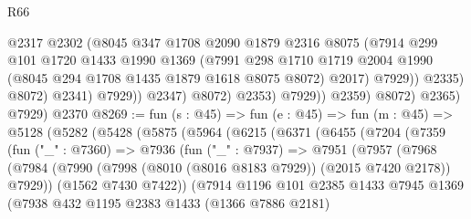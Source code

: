 \begin{lexlean}{R66}
\begin{coremodule}
                                @2317
                                @2302
                                (@8045
                                  @347
                                  @1708
                                  @2090
                                  @1879
                                  @2316
                                  @8075
                                  (@7914
                                    @299
                                    @101
                                    @1720
                                    @1433
                                    @1990
                                    @1369
                                    (@7991
                                      @298
                                      @1710
                                      @1719
                                      @2004
                                      @1990
                                      (@8045 @294 @1708 @1435 @1879 @1618 @8075 @8072)
                                      @2017)
                                    @7929))
                                @2335)
                              @8072)
                            @2341)
                          @7929))
                      @2347)
                    @8072)
                  @2353)
                @7929))
            @2359)
          @8072)
        @2365)
      @7929)
    @2370
@8269 := fun (s : @45) =>
  fun (e : @45) =>
  fun (m : @45) =>
  @5128
    (@5282
      (@5428
        (@5875
          (@5964
            (@6215
              (@6371
                (@6455
                  (@7204
                    (@7359
                      (fun ("_" : @7360) =>
                      @7936
                        (fun ("_" : @7937) =>
                        @7951
                          (@7957
                            (@7968
                              (@7984
                                (@7990
                                  (@7998 (@8010 (@8016 @8183 @7929)) (@2015 @7420 @2178))
                                  @7929))
                              (@1562 @7430 @7422))
                            (@7914
                              @1196
                              @101
                              @2385
                              @1433
                              @7945
                              @1369
                              (@7938
                                @432
                                @1195
                                @2383
                                @1433
                                (@1366 @7886 @2181)

\end{coremodule}
\end{lexlean}
